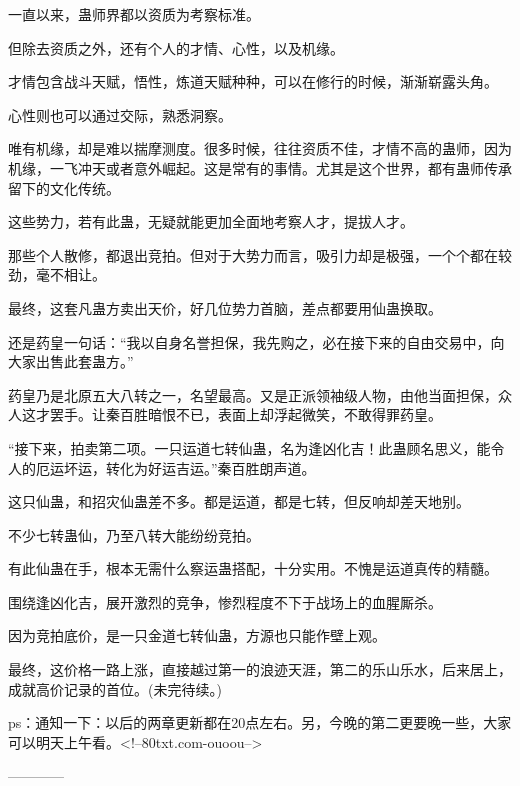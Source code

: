 \begin{this_body}
一直以来，蛊师界都以资质为考察标准。

但除去资质之外，还有个人的才情、心性，以及机缘。

才情包含战斗天赋，悟性，炼道天赋种种，可以在修行的时候，渐渐崭露头角。

心性则也可以通过交际，熟悉洞察。

唯有机缘，却是难以揣摩测度。很多时候，往往资质不佳，才情不高的蛊师，因为机缘，一飞冲天或者意外崛起。这是常有的事情。尤其是这个世界，都有蛊师传承留下的文化传统。

这些势力，若有此蛊，无疑就能更加全面地考察人才，提拔人才。

那些个人散修，都退出竞拍。但对于大势力而言，吸引力却是极强，一个个都在较劲，毫不相让。

最终，这套凡蛊方卖出天价，好几位势力首脑，差点都要用仙蛊换取。

还是药皇一句话：“我以自身名誉担保，我先购之，必在接下来的自由交易中，向大家出售此套蛊方。”

药皇乃是北原五大八转之一，名望最高。又是正派领袖级人物，由他当面担保，众人这才罢手。让秦百胜暗恨不已，表面上却浮起微笑，不敢得罪药皇。

“接下来，拍卖第二项。一只运道七转仙蛊，名为逢凶化吉！此蛊顾名思义，能令人的厄运坏运，转化为好运吉运。”秦百胜朗声道。

这只仙蛊，和招灾仙蛊差不多。都是运道，都是七转，但反响却差天地别。

不少七转蛊仙，乃至八转大能纷纷竞拍。

有此仙蛊在手，根本无需什么察运蛊搭配，十分实用。不愧是运道真传的精髓。

围绕逢凶化吉，展开激烈的竞争，惨烈程度不下于战场上的血腥厮杀。

因为竞拍底价，是一只金道七转仙蛊，方源也只能作壁上观。

最终，这价格一路上涨，直接越过第一的浪迹天涯，第二的乐山乐水，后来居上，成就高价记录的首位。(未完待续。)

ps：通知一下：以后的两章更新都在20点左右。另，今晚的第二更要晚一些，大家可以明天上午看。<!--80txt.com-ouoou-->

------------

\end{this_body}

